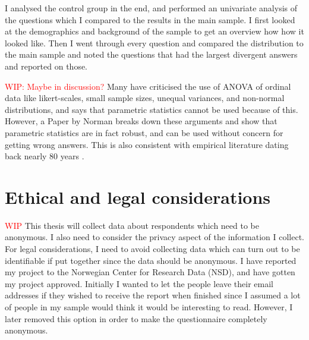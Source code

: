 I analysed the control group in the end, and performed an univariate analysis of the questions which I compared to the results in the main sample. I first looked at the demographics and background of the sample to get an overview how how it looked like. Then I went through every question and compared the distribution to the main sample and noted the questions that had the largest divergent answers and reported on those. 

\textcolor{red}{WIP: Maybe in discussion?} 
Many have criticised the use of ANOVA of ordinal data like likert-scales, small sample sizes, unequal variances, and non-normal distributions, and says that parametric statistics cannot be used because of this. However, a Paper by Norman \cite{Norman2010} breaks down these arguments and show that parametric statistics are in fact robust, and can be used without concern for getting wrong answers. This is also consistent with empirical literature dating back nearly 80 years \cite{Norman2010}. 

\section{Ethical and legal considerations}
\textcolor{red}{WIP}
This thesis will collect data about respondents which need to be anonymous. I also need to consider the privacy aspect of the information I collect. For legal considerations, I need to avoid collecting data which can turn out to be identifiable if put together since the data should be anonymous. I have reported my project to the Norwegian Center for Research Data (NSD), and have gotten my project approved. Initially I wanted to let the people leave their email addresses if they wished to receive the report when finished since I assumed a lot of people in my sample would think it would be interesting to read. However, I later removed this option in order to make the questionnaire completely anonymous. 



